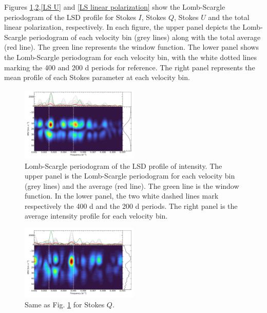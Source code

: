 \documentclass{aa}
\begin{document}
Figures \ref{LS intensity},\ref{LS Q},\ref{LS U} and \ref{LS linear polarization} show the Lomb-Scargle periodogram of the LSD profile for Stokes $I$, Stokes $Q$, Stokes $U$ and the total linear polarization, respectively. 
In each figure, the upper panel depicts the Lomb-Scargle periodogram of each velocity bin (grey lines) along with the total average (red line). The green line represents the window function. The lower panel shows the Lomb-Scargle periodogram for each velocity bin, with the white dotted lines marking the 400 and 200 d periods for reference. The right panel represents the mean profile of each Stokes parameter at each velocity bin.

\begin{figure}[!h]
    \centering
    \includegraphics[width=0.5\textwidth]{Lomb-Scargle Intensity.pdf}
    \caption{Lomb-Scargle periodogram of the LSD profile of intensity.
    The upper panel is the Lomb-Scargle periodogram for each velocity bin (grey lines) and the average (red line). The green line is the window function.
    In the lower panel, the two white dashed lines mark respectively the 400 d and the 200 d periods. The right panel is the average intensity profile for each velocity bin.}
    \label{LS intensity}
\end{figure}

\begin{figure}[!h]
    \centering
    \includegraphics[width=0.5\textwidth]{Lomb-Scargle Stokes Q.pdf}
    \caption{Same as Fig. \ref{LS intensity} for Stokes $Q$. }
    \label{LS Q}
\end{figure}
\end{document}
